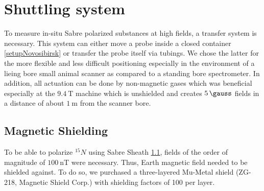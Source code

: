 	\section{Shuttling system}\label{sec:shuttlingSystem}
		To measure in-situ Sabre polarized substances at high fields, a transfer system is
		necessary. This system can either move a probe inside a closed container
		\ref{setupNovosibirsk} or transfer the probe itself via tubings. We chose the latter for the
		more flexible and less difficult positioning especially in the environment of a lieing bore
		small animal scanner as compared to a standing bore spectrometer. In addition, all actuation
		can be done by non-magnetic gases which was beneficial especially at the $\SI{9.4}{\tesla}$
		machine which is unshielded and creates $\SI{5}{\gauss}$ fields in a distance of about $\SI{1}{\meter}$ from
		the scanner bore.
		\subsection{Magnetic Shielding}
			To be able to polarize $^{15}N$ using Sabre Sheath \ref{}, fields of the order of
			magnitude of $\SI{100}{\nano\tesla}$ were necessary. Thus, Earth magnetic field needed to
			be shielded against. To do so, we purchased a three-layered Mu-Metal shield (ZG-218, Magnetic
			Shield Corp.) with shielding factors of 100 per layer.
